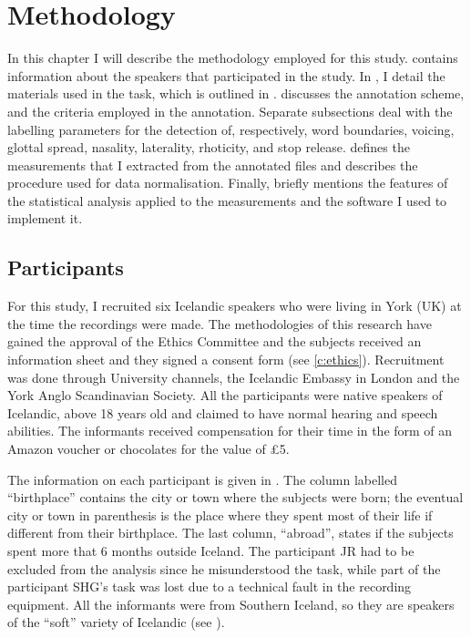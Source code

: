 \documentclass[11pt,a4paper,oneside,openany]{memoir}\usepackage[]{graphicx}\usepackage[]{color}
\begin{document}
\chapter{Methodology}
\label{c:methodology}
In this chapter I will describe the methodology employed for this study.
 contains information about the speakers that participated in the study.
In , I detail the materials used in the task, which is outlined in .
 discusses the annotation scheme, and the criteria employed in the annotation.
Separate subsections deal with the labelling parameters for the detection of, respectively, word boundaries, voicing, glottal spread, nasality, laterality, rhoticity, and stop release.
 defines the measurements that I extracted from the annotated files and describes the procedure used for data normalisation.
Finally,  briefly mentions the features of the statistical analysis applied to the measurements and the software I used to implement it.

\section{Participants}
\label{s:participants}

For this study, I recruited six Icelandic speakers who were living in York (UK) at the time the recordings were made.
The methodologies of this research have gained the approval of the Ethics Committee and the subjects received an information sheet and they signed a consent form (see \ref{c:ethics}).
Recruitment was done through University channels, the Icelandic Embassy in London and the York Anglo Scandinavian Society.
All the participants were native speakers of Icelandic, above 18 years old and claimed to have normal hearing and speech abilities.
The informants received compensation for their time in the form of an Amazon voucher or chocolates for the value of £5.

The information on each participant is given in .
The column labelled ``birthplace'' contains the city or town where the subjects were born; the eventual city or town in parenthesis is the place where they spent most of their life if different from their birthplace.
The last column, ``abroad'', states if the subjects spent more that 6 months outside Iceland.
The participant JR had to be excluded from the analysis since he misunderstood the task, while part of the participant SHG's task was lost due to a technical fault in the recording equipment.
All the informants were from Southern Iceland, so they are speakers of the ``soft'' variety of Icelandic (see ).
\end{document}
